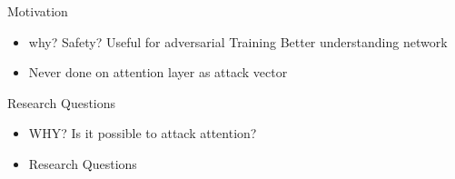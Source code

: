 Motivation
\begin{itemize}
    \item why?
          \subitem Safety?
          \subitem Useful for adversarial Training
          \subitem Better understanding network
    \item Never done on attention layer as attack vector
\end{itemize}

Research Questions
\begin{itemize}
    \item WHY?
          \subitem Is it possible to attack attention?
    \item Research Questions
\end{itemize}
